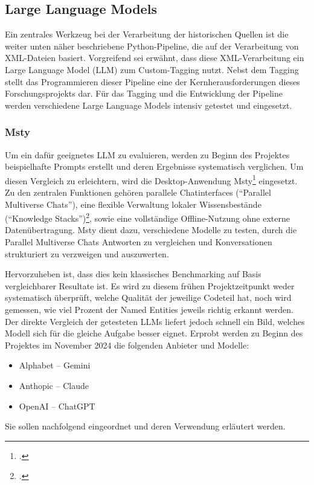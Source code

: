 \documentclass[12pt, a4paper, ngerman, bidi=default]{article}
\let\cite\footcite
\begin{document}
\subsection{Large Language Models} \label{subsubsec:LLM_use}
Ein zentrales Werkzeug bei der Verarbeitung der historischen Quellen ist die weiter unten näher beschriebene Python-Pipeline, die auf der Verarbeitung von XML-Dateien basiert. Vorgreifend sei erwähnt, dass diese XML-Verarbeitung ein Large Language Model (LLM) zum Custom-Tagging nutzt. Nebst dem Tagging stellt das Programmieren dieser Pipeline eine der Kernherausforderungen dieses Forschungsprojekts dar. 
Für das Tagging und die Entwicklung der Pipeline werden verschiedene Large Language Models intensiv getestet und eingesetzt.
\subsubsection{Msty}
Um ein dafür geeignetes LLM zu evaluieren, werden zu Beginn des Projektes beispielhafte Prompts erstellt und deren Ergebnisse systematisch verglichen. Um diesen Vergleich zu erleichtern, wird die Desktop-Anwendung Msty\cite[vgl.][]{noauthor_msty_nodate} eingesetzt. Zu den zentralen Funktionen gehören parallele Chatinterfaces (\enquote{Parallel Multiverse Chats}),
eine flexible Verwaltung lokaler Wissensbestände (\enquote{Knowledge Stacks})\cite[vgl.][]{noauthor_msty_nodate}, sowie eine vollständige Offline-Nutzung ohne externe Datenübertragung. Msty dient dazu, verschiedene Modelle zu testen, durch die Parallel Multiverse Chats Antworten zu vergleichen und Konversationen strukturiert zu verzweigen und auszuwerten.

Hervorzuheben ist, dass dies kein klassisches Benchmarking auf Basis vergleichbarer Resultate ist. Es wird zu diesem frühen Projektzeitpunkt weder systematisch überprüft, welche Qualität der jeweilige Codeteil hat, noch wird gemessen, wie viel Prozent der Named Entities jeweils richtig erkannt werden. Der direkte Vergleich der getesteten LLMs liefert jedoch schnell ein Bild, welches Modell sich für die gleiche Aufgabe besser eignet. Erprobt werden zu Beginn des Projektes im November 2024 die folgenden Anbieter und Modelle:
\begin{itemize}
    \item Alphabet – Gemini
    \item Anthopic – Claude
    \item OpenAI – ChatGPT
\end{itemize}
Sie sollen nachfolgend eingeordnet und deren Verwendung erläutert werden.
\end{document}
